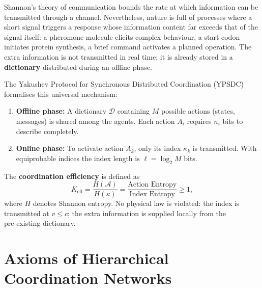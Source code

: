 \documentclass[12pt,a4paper]{article}
\begin{document}
	Shannon's theory of communication bounds the rate at which information can be transmitted through a channel.  Nevertheless, nature is full of processes where a short signal triggers a response whose information content far exceeds that of the signal itself: a pheromone molecule elicits complex behaviour, a start codon initiates protein synthesis, a brief command activates a planned operation.  The extra information is not transmitted in real time; it is already stored in a \textbf{dictionary} distributed during an offline phase.
	
	The Yakushev Protocol for Synchronous Distributed Coordination (YPSDC) formalises this universal mechanism:
	\begin{enumerate}[label=(\roman*)]
		\item \textbf{Offline phase:} A dictionary \(\mathcal{D}\) containing \(M\) possible actions (states, messages) is shared among the agents.  Each action \(A_i\) requires \(n_i\) bits to describe completely.
		\item \textbf{Online phase:} To activate action \(A_k\), only its index \(\kappa_k\) is transmitted.  With equiprobable indices the index length is \(\ell = \log_2 M\) bits.
	\end{enumerate}
	The \textbf{coordination efficiency} is defined as
	\begin{equation}
		\boxed{K_{\mathrm{eff}} = \frac{H(\mathcal{A})}{H(\kappa)} = \frac{\text{Action Entropy}}{\text{Index Entropy}} \ge 1},
		\label{eq:keff-def}
	\end{equation}
	where \(H\) denotes Shannon entropy.  No physical law is violated: the index is transmitted at \(v \le c\); the extra information is supplied locally from the pre‑existing dictionary.
	
	\begin{center}
	\end{center}
	
	\section{Axioms of Hierarchical Coordination Networks}
	
\end{document}
